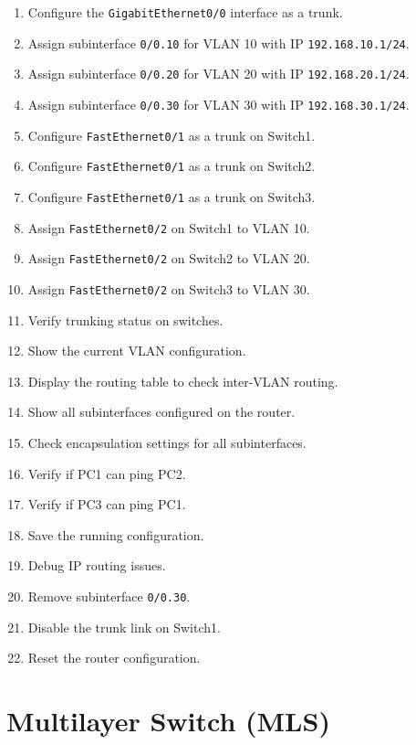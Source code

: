\documentclass[a4paper]{book}
\begin{document}
\begin{enumerate}
    \item Configure the \texttt{GigabitEthernet0/0} interface as a trunk.
    \item Assign subinterface \texttt{0/0.10} for VLAN 10 with IP \texttt{192.168.10.1/24}.
    \item Assign subinterface \texttt{0/0.20} for VLAN 20 with IP \texttt{192.168.20.1/24}.
    \item Assign subinterface \texttt{0/0.30} for VLAN 30 with IP \texttt{192.168.30.1/24}.
    \item Configure \texttt{FastEthernet0/1} as a trunk on Switch1.
    \item Configure \texttt{FastEthernet0/1} as a trunk on Switch2.
    \item Configure \texttt{FastEthernet0/1} as a trunk on Switch3.
    \item Assign \texttt{FastEthernet0/2} on Switch1 to VLAN 10.
    \item Assign \texttt{FastEthernet0/2} on Switch2 to VLAN 20.
    \item Assign \texttt{FastEthernet0/2} on Switch3 to VLAN 30.
    \item Verify trunking status on switches.
    \item Show the current VLAN configuration.
    \item Display the routing table to check inter-VLAN routing.
    \item Show all subinterfaces configured on the router.
    \item Check encapsulation settings for all subinterfaces.
    \item Verify if PC1 can ping PC2.
    \item Verify if PC3 can ping PC1.
    \item Save the running configuration.
    \item Debug IP routing issues.
    \item Remove subinterface \texttt{0/0.30}.
    \item Disable the trunk link on Switch1.
    \item Reset the router configuration.
\end{enumerate}

\newpage

\chapter{Multilayer Switch (MLS)}
\end{document}
